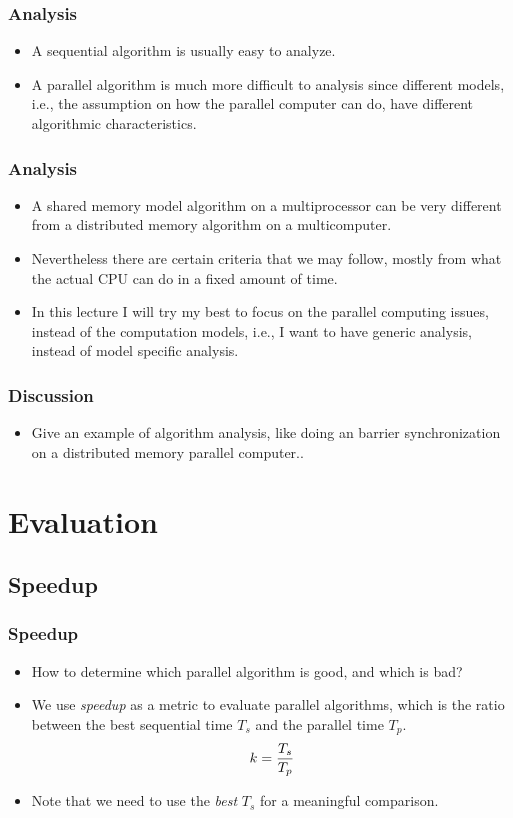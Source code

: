 \documentclass{beamer}
\begin{document}
\begin{CJK}{UTF8}{bsmi}
\begin{frame}
\frametitle{Analysis}
\begin{itemize}
\item A sequential algorithm is usually easy to analyze.
\item A parallel algorithm is much more difficult to analysis since
  different models, i.e., the assumption on how the parallel computer
  can do, have different algorithmic characteristics.
\end{itemize}
\end{frame}

\begin{frame}
\frametitle{Analysis}
\begin{itemize}
\item A shared memory model algorithm on a multiprocessor can be very
  different from a distributed memory algorithm on a multicomputer.
\item Nevertheless there are certain criteria that we may follow,
  mostly from what the actual CPU can do in a fixed amount of time.
\item In this lecture I will try my best to focus on the parallel
  computing issues, instead of the computation models, i.e., I want to
  have generic analysis, instead of model specific analysis.
\end{itemize}
\end{frame}

\begin{frame}
\frametitle{Discussion}
\begin{itemize}
\item Give an example of algorithm analysis, like doing an barrier
  synchronization on a distributed memory parallel computer..
\end{itemize}
\end{frame}

\section{Evaluation}

\subsection{Speedup}

\begin{frame}
\frametitle{Speedup}
\begin{itemize}
\item How to determine which parallel algorithm is good, and which is
  bad?
\item We use {\em speedup} as a metric to evaluate parallel
  algorithms, which is the ratio between the best sequential time $T_s$
  and the parallel time $T_p$.
\begin{equation} 
k = {{T_s}\over{T_p}}
\end{equation}
\item Note that we need to use the {\em best} $T_s$ for a meaningful
  comparison.
\end{itemize}
\end{frame}


\end{CJK}
\end{document}
